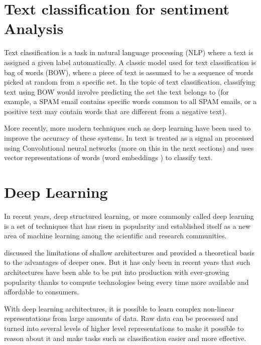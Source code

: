 \section{Text classification for sentiment Analysis}

Text classification is a task in natural language processing \cite{chowdhury2003natural} (NLP) where a text is assigned a given label automatically. A classic model used for text classification is bag of words \cite{wallach2006topic} (BOW), where a piece of text is assumed to be a sequence of words picked at random from a specific set. In the topic of text classification, classifying text using BOW would involve predicting the set the text belongs to (for example, a SPAM email contains specific words common to all SPAM emails, or a positive text may contain words that are different from a negative text).

More recently, more modern techniques such as deep learning have been used to improve the accuracy of these systems. In \cite{zhang2015character} text is treated as a signal an processed using Convolutional neural networks (more on this in the next sections) and \cite{DBLP:journals/corr/Kim14f} uses vector representations of words (word embeddings \cite{goldberg2014word2vec}) to classify text.


\section{Deep Learning} \label{sec:dnn}

In recent years, deep structured learning, or more commonly called deep learning is a set of techniques that has risen in popularity and established itself as a new area of machine learning among the scientific and research communities. \cite{deng2014deep}

\cite{bengio2009learning} discussed the limitations of shallow architectures and provided a theoretical basis to the advantages of deeper ones. But it has only been in recent years that such architectures have been able to be put into production with ever-growing popularity thanks to compute technologies being every time more available and affordable to consumers.

With deep learning architectures, it is possible to learn complex non-linear representations from large amounts of data. Raw data can be processed and turned into several levels of higher level representations to make it possible to reason about it and make tasks such as classification easier and more effective.

